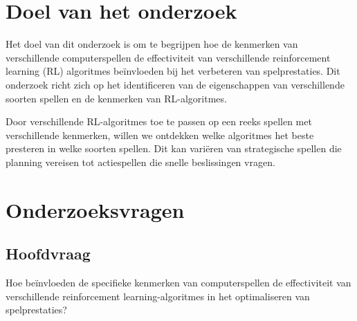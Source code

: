 \documentclass[a4paper,12pt]{report}
\begin{document}
\section{Doel van het onderzoek}
Het doel van dit onderzoek is om te begrijpen hoe de kenmerken van
verschillende computerspellen de effectiviteit van verschillende reinforcement
learning (RL) algoritmes beïnvloeden bij het verbeteren van spelprestaties. Dit
onderzoek richt zich op het identificeren van de eigenschappen van
verschillende soorten spellen en de kenmerken van RL-algoritmes.

Door verschillende RL-algoritmes toe te passen op een reeks spellen met
verschillende kenmerken, willen we ontdekken welke algoritmes het beste
presteren in welke soorten spellen. Dit kan variëren van strategische spellen
die planning vereisen tot actiespellen die snelle beslissingen vragen.
\section{Onderzoeksvragen}
\subsection{Hoofdvraag}
Hoe beïnvloeden de specifieke kenmerken van computerspellen de effectiviteit
van verschillende reinforcement learning-algoritmes in het optimaliseren van
spelprestaties?
\end{document}

